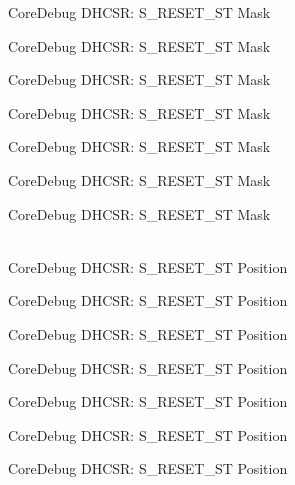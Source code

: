 \begin{DoxyRefList}
\label{deprecated__deprecated000110}%
%
Core\+Debug DHCSR:\+ S\+\_\+\+RESET\+\_\+\+ST Mask 

\label{deprecated__deprecated000164}%
%
Core\+Debug DHCSR:\+ S\+\_\+\+RESET\+\_\+\+ST Mask 

\label{deprecated__deprecated000249}%
%
Core\+Debug DHCSR:\+ S\+\_\+\+RESET\+\_\+\+ST Mask 

\label{deprecated__deprecated000306}%
%
Core\+Debug DHCSR:\+ S\+\_\+\+RESET\+\_\+\+ST Mask 

\label{deprecated__deprecated000382}%
%
Core\+Debug DHCSR:\+ S\+\_\+\+RESET\+\_\+\+ST Mask 

\label{deprecated__deprecated000461}%
%
Core\+Debug DHCSR:\+ S\+\_\+\+RESET\+\_\+\+ST Mask 

\label{deprecated__deprecated000563}%
%
Core\+Debug DHCSR:\+ S\+\_\+\+RESET\+\_\+\+ST Mask  
\item[{\parbox[t]{\linewidth}{Global \doxylink{group__CMSIS__CoreDebug_ga6f934c5427ea057394268e541fa97753}{Core\+Debug\+\_\+\+DHCSR\+\_\+\+S\+\_\+\+RESET\+\_\+\+ST\+\_\+\+Pos} }}]\hfill \\
\label{deprecated__deprecated000009}%
%
Core\+Debug DHCSR:\+ S\+\_\+\+RESET\+\_\+\+ST Position 

\label{deprecated__deprecated000109}%
%
Core\+Debug DHCSR:\+ S\+\_\+\+RESET\+\_\+\+ST Position 

\label{deprecated__deprecated000163}%
%
Core\+Debug DHCSR:\+ S\+\_\+\+RESET\+\_\+\+ST Position 

\label{deprecated__deprecated000248}%
%
Core\+Debug DHCSR:\+ S\+\_\+\+RESET\+\_\+\+ST Position 

\label{deprecated__deprecated000305}%
%
Core\+Debug DHCSR:\+ S\+\_\+\+RESET\+\_\+\+ST Position 

\label{deprecated__deprecated000381}%
%
Core\+Debug DHCSR:\+ S\+\_\+\+RESET\+\_\+\+ST Position 

\label{deprecated__deprecated000460}%
%
Core\+Debug DHCSR:\+ S\+\_\+\+RESET\+\_\+\+ST Position 


\end{DoxyRefList}

